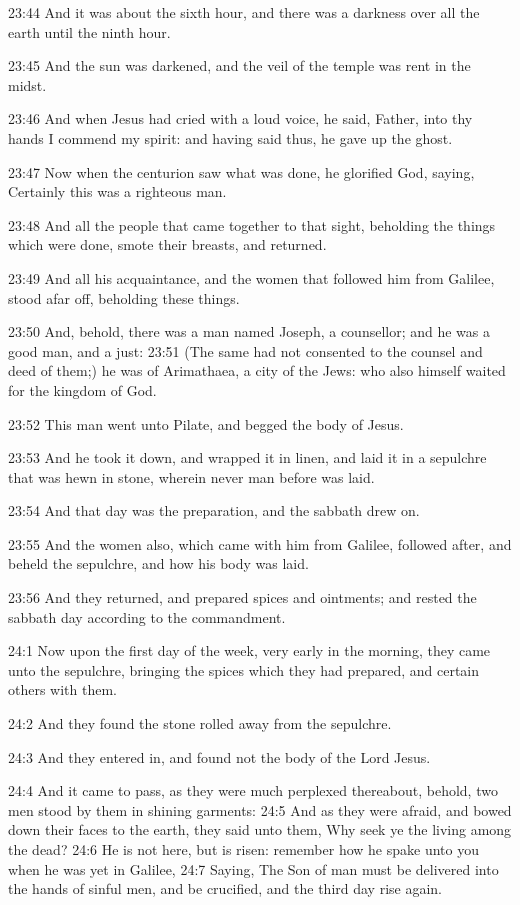 23:44 And it was about the sixth hour, and there was a darkness over all the earth until the ninth hour.

23:45 And the sun was darkened, and the veil of the temple was rent in the midst.

23:46 And when Jesus had cried with a loud voice, he said, Father, into thy hands I commend my spirit: and having said thus, he gave up the ghost.

23:47 Now when the centurion saw what was done, he glorified God, saying, Certainly this was a righteous man.

23:48 And all the people that came together to that sight, beholding the things which were done, smote their breasts, and returned.

23:49 And all his acquaintance, and the women that followed him from Galilee, stood afar off, beholding these things.

23:50 And, behold, there was a man named Joseph, a counsellor; and he was a good man, and a just: 23:51 (The same had not consented to the counsel and deed of them;) he was of Arimathaea, a city of the Jews: who also himself waited for the kingdom of God.

23:52 This man went unto Pilate, and begged the body of Jesus.

23:53 And he took it down, and wrapped it in linen, and laid it in a sepulchre that was hewn in stone, wherein never man before was laid.

23:54 And that day was the preparation, and the sabbath drew on.

23:55 And the women also, which came with him from Galilee, followed after, and beheld the sepulchre, and how his body was laid.

23:56 And they returned, and prepared spices and ointments; and rested the sabbath day according to the commandment.

24:1 Now upon the first day of the week, very early in the morning, they came unto the sepulchre, bringing the spices which they had prepared, and certain others with them.

24:2 And they found the stone rolled away from the sepulchre.

24:3 And they entered in, and found not the body of the Lord Jesus.

24:4 And it came to pass, as they were much perplexed thereabout, behold, two men stood by them in shining garments: 24:5 And as they were afraid, and bowed down their faces to the earth, they said unto them, Why seek ye the living among the dead?  24:6 He is not here, but is risen: remember how he spake unto you when he was yet in Galilee, 24:7 Saying, The Son of man must be delivered into the hands of sinful men, and be crucified, and the third day rise again.

